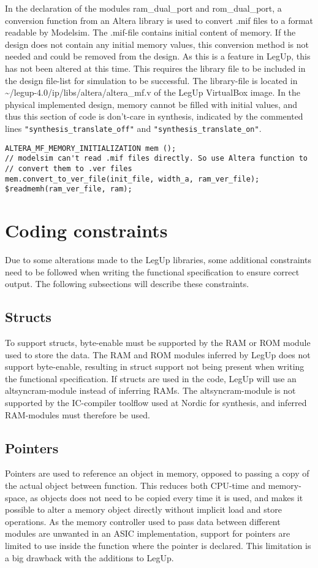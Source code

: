 In the declaration of the modules ram\_dual\_port and rom\_dual\_port, a conversion function from an Altera library is used to convert .mif files to a format readable by Modelsim. The .mif-file contains initial content of memory. If the design does not contain any initial memory values, this conversion method is not needed and could be removed from the design. As this is a feature in LegUp, this has not been altered at this time. This requires the library file to be included in the design file-list for simulation to be successful. The library-file is located in \textasciitilde/legup-4.0/ip/libs/altera/altera\_mf.v of the LegUp VirtualBox image. In the physical implemented design, memory cannot be filled with initial values, and thus this section of code is don't-care in synthesis, indicated by the commented lines \verb!"synthesis_translate_off"! and \verb!"synthesis_translate_on"!. 
\lstset{language=Verilog, style=VerilogStyle}
\begin{lstlisting}
ALTERA_MF_MEMORY_INITIALIZATION mem ();
// modelsim can't read .mif files directly. So use Altera function to
// convert them to .ver files
mem.convert_to_ver_file(init_file, width_a, ram_ver_file);
$readmemh(ram_ver_file, ram);
\end{lstlisting}

\section{Coding constraints}
Due to some alterations made to the LegUp libraries, some additional constraints need to be followed when writing the functional specification to ensure correct output. The following subsections will describe these constraints.
\subsection{Structs}
To support structs, byte-enable must be supported by the RAM or ROM module used to store the data. The RAM and ROM modules inferred by LegUp does not support byte-enable, resulting in struct support not being present when writing the functional specification. If structs are used in the code, LegUp will use an altsyncram-module instead of inferring RAMs. The altsyncram-module is not supported by the IC-compiler toolflow used at Nordic for synthesis, and inferred RAM-modules must therefore be used. 
\subsection{Pointers}
Pointers are used to reference an object in memory, opposed to passing a copy of the actual object between function. This reduces both CPU-time and memory-space, as objects does not need to be copied every time it is used, and makes it possible to alter a memory object directly without implicit load and store operations. As the memory controller used to pass data between different modules are unwanted in an ASIC implementation, support for pointers are limited to use inside the function where the pointer is declared. This limitation is a big drawback with the additions to LegUp.
